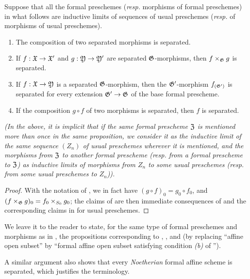 \begin{prop}[10.15.3]
\label{1.10.15.3}
Suppose that all the formal preschemes (\emph{resp.} morphisms of formal preschemes) in what follows are inductive limits of sequences of usual preschemes (\emph{resp.} of morphisms of usual preschemes).
\begin{enumerate}[label=\emph{(\roman*)}]
    \item The composition of two separated morphisms is separated.
    \item If $f:\fk{X}\to\fk{X}'$ and $g:\fk{Y}\to\fk{Y}'$ are separated $\mathfrak{G}$-morphisms, then $f\times_\mathfrak{G}g$ is separated.
    \item If $f:\fk{X}\to\fk{Y}$ is a separated $\mathfrak{G}$-morphism, then the $\mathfrak{G}'$-morphism $f_{(\mathfrak{G}')}$ is separated for every extension $\fk{G}'\to\fk{G}$ of the base formal prescheme.
    \item If the composition $g\circ f$ of two morphisms is separated, then $f$ is separated.
\end{enumerate}
\emph{(In the above, it is implicit that if the same formal prescheme $\mathfrak{Z}$ is mentioned more than once in the same proposition, we consider it as the inductive limit of the \emph{same} sequence $(Z_n)$ of usual preschemes wherever it is mentioned, and the morphisms from $\mathfrak{Z}$ to another formal prescheme (resp. from a formal prescheme to $\mathfrak{Z}$) as inductive limits of morphisms from $Z_n$ to some usual preschemes (resp. from some usual preschemes to $Z_n$)).}
\end{prop}

\begin{proof}
\label{proof-1.10.15.3}
With the notation of , we in fact have $(g\circ f)_0=g_0\circ f_0$, and $(f\times_\mathfrak{G}g)_0=f_0\times_{S_0}g_0$;
the claims of  are then immediate consequences of  and the corresponding claims in  for usual preschemes.
\end{proof}

We leave it to the reader to state, for the same type of formal preschemes and morphisms as in , the propositions corresponding to , , and 
(by replacing ``affine open subset'' by ``formal affine open subset satisfying condition \emph{(b)} of '').

A similar argument also shows that every \emph{Noetherian} formal affine scheme is separated, which justifies the terminology.

